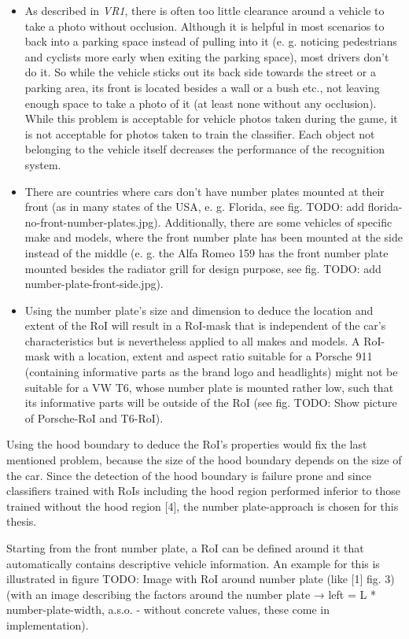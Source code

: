 \begin{itemize}
  \item As described in \emph{VR1}, there is often too little clearance around a vehicle to take a photo without occlusion. Although it is helpful in most scenarios to back into a parking space instead of pulling into it (e. g. noticing pedestrians and cyclists more early when exiting the parking space), most drivers don't do it. So while the vehicle sticks out its back side towards the street or a parking area, its front is located besides a wall or a bush etc., not leaving enough space to take a photo of it (at least none without any occlusion). While this problem is acceptable for vehicle photos taken during the game, it is not acceptable for photos taken to train the classifier. Each object not belonging to the vehicle itself decreases the performance of the recognition system.
  \item There are countries where cars don't have number plates mounted at their front (as in many states of the USA, e. g. Florida, see fig. TODO: add florida-no-front-number-plates.jpg). Additionally, there are some vehicles of specific make and models, where the front number plate has been mounted at the side instead of the middle (e. g. the Alfa Romeo 159 has the front number plate mounted besides the radiator grill for design purpose, see fig. TODO: add number-plate-front-side.jpg).
  \item Using the number plate's size and dimension to deduce the location and extent of the RoI will result in a RoI-mask that is independent of the car's characteristics but is nevertheless applied to all makes and models. A RoI-mask with a location, extent and aspect ratio suitable for a Porsche 911 (containing informative parts as the brand logo and headlights) might not be suitable for a VW T6, whose number plate is mounted rather low, such that its informative parts will be outside of the RoI (see fig. TODO: Show picture of Porsche-RoI and T6-RoI).
\end{itemize}
Using the hood boundary to deduce the RoI’s properties would fix the last mentioned problem, because the size of the hood boundary depends on the size of the car. Since the detection of the hood boundary is failure prone and since classifiers trained with RoIs including the hood region performed inferior to those trained without the hood region [4], the number plate-approach is chosen for this thesis.

Starting from the front number plate, a RoI can be defined around it that automatically contains descriptive vehicle information. An example for this is illustrated in figure TODO: Image with RoI around number plate (like [1] fig. 3) (with an image describing the factors around the number plate → left = L * number-plate-width, a.s.o. - without concrete values, these come in implementation).

